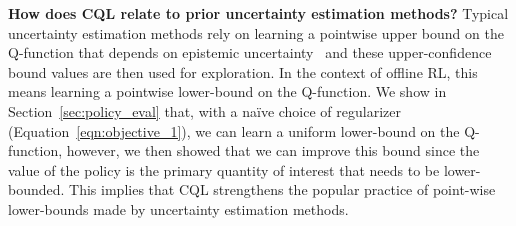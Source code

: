 \textbf{How does CQL relate to prior uncertainty estimation methods?} Typical uncertainty estimation methods rely on learning a pointwise upper bound on the Q-function that depends on epistemic uncertainty~\citep{jaksch2010near,osband2017posterior} and these upper-confidence bound values are then used for exploration. In the context of offline RL, this means learning a pointwise lower-bound on the Q-function. We show in Section~\ref{sec:policy_eval} that, with a na\"ive choice of regularizer (Equation~\ref{eqn:objective_1}), we can learn a uniform lower-bound on the Q-function, however, we then showed that we can improve this bound since the value of the policy is the primary quantity of interest that needs to be lower-bounded. This implies that CQL strengthens the popular practice of point-wise lower-bounds made by uncertainty estimation methods.

